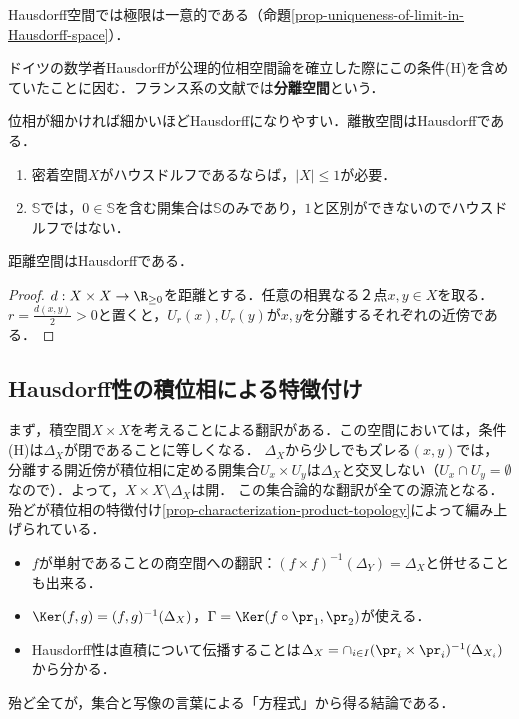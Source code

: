 \documentclass[uplatex,dvipdfmx]{jsreport}
\begin{document}
\begin{remark}
    Hausdorff空間では極限は一意的である（命題\ref{prop-uniqueness-of-limit-in-Hausdorff-space}）．
\end{remark}

\begin{remark}
    ドイツの数学者Hausdorffが公理的位相空間論を確立した際にこの条件(H)を含めていたことに因む．フランス系の文献では\textbf{分離空間}という．
\end{remark}

\begin{remark}
    位相が細かければ細かいほどHausdorffになりやすい．離散空間はHausdorffである．
    \begin{enumerate}
        \item 密着空間$X$がハウスドルフであるならば，$|X|\le 1$が必要．
        \item $\mathbb{S}$では，$0\in\mathbb{S}$を含む開集合は$\mathbb{S}$のみであり，$1$と区別ができないのでハウスドルフではない．
    \end{enumerate}
\end{remark}

\begin{proposition}\label{prop-metric-space-is-Hausdorff}
    距離空間はHausdorffである．
\end{proposition}
\begin{proof}
    $d:X\times X\to\R_{\ge 0}$を距離とする．任意の相異なる２点$x,y\in X$を取る．
    $r=\frac{d(x,y)}{2}>0$と置くと，$U_r(x),U_r(y)$が$x,y$を分離するそれぞれの近傍である．
\end{proof}

\subsection{Hausdorff性の積位相による特徴付け}

\begin{tcolorbox}[colframe=ForestGreen, colback=ForestGreen!10!white, breakable ,colbacktitle=ForestGreen!40!white, coltitle=black,fonttitle=\bfseries\sffamily
    ,title=集合論による計算の本領]
    まず，積空間$X\times X$を考えることによる翻訳がある．この空間においては，条件(H)は$\Delta_X$が閉であることに等しくなる．
    $\Delta_X$から少しでもズレる$(x,y)$では，分離する開近傍が積位相に定める開集合$U_x\times U_y$は$\Delta_X$と交叉しない（$U_x\cap U_y=\emptyset$なので）．よって，$X\times X\setminus\Delta_X$は開．
    この集合論的な翻訳が全ての源流となる．殆どが積位相の特徴付け\ref{prop-characterization-product-topology}によって編み上げられている．
    \begin{itemize}
        \item $f$が単射であることの商空間への翻訳：$(f\times f)^{-1}(\Delta_Y)=\Delta_X$と併せることも出来る．
        \item $\Ker(f,g)=(f,g)^{-1}(\Delta_X)$，$\Gamma=\Ker(f\circ\pr_1,\pr_2)$が使える．
        \item Hausdorff性は直積について伝播することは$\Delta_X=\cap_{i\in I}(\pr_i\times\pr_i)^{-1}(\Delta_{X_i})$から分かる．
    \end{itemize}
    殆ど全てが，集合と写像の言葉による「方程式」から得る結論である．
\end{tcolorbox}
\end{document}
